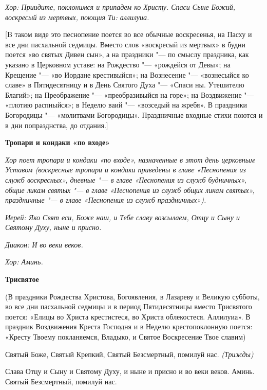 \itshape  Хор:\normalfont{} Приидите, поклонимся и припадем ко Христу. Спаси Сыне Божий, воскресый из мертвых, поющия Ти: аллилуиа.


[B таком виде это песнопение поется во все обычные воскресенья, на Пасху и все дни пасхальной седмицы. Вместо слов «воскресый из мертвых» в будни поется «во святых Дивен сын», а на праздники "--- по смыслу праздника, как указано в Церковном уставе: на Рождество "--- «рождейся от Девы»; на Крещение "--- «во Иордане крестивыйся»; на Вознесение "--- «вознесыйся ко славе» в Пятидесятницу и в День Святого Духа "--- «Спаси ны. Утешителю Благий»; на Преображение "--- «преобразивыйся на горе»; на Воздвижение "--- «плотию распныйся»; в Неделю ваий "--- «возседый на жребя». В праздники Богородицы "--- «молитвами Богородицы». Праздничные входные стихи поются и в дни попразднства, до отдания.]


\medskip
\bfseries Тропари и кондаки «по входе» \normalfont{}


\itshape Хор поет тропари и кондаки «по входе», назначенные в этот день церковным Уставом (воскресные тропари и кондаки приведены в главе «Песнопения из служб воскресных», дневные "--- в главе «Песнопения из служб будничных», общие ликам святых "--- в главе «Песнопения из служб общих ликам святых», праздничные "--- в главе «Песнопения из служб праздничных»).\normalfont{}


\itshape Иерей:\normalfont{} Яко Свят еси, Боже наш, и Тебе славу возсылаем, Отцу и Сыну и Святому Духу, ныне и присно.


\itshape Диакон:\normalfont{} И во веки веков.


\itshape Хор:\normalfont{} Аминь.




\medskip


\bfseries Трисвятое \normalfont{}


(В праздники Рождества Христова, Богоявления, в Лазареву и Великую субботы, во все дни пасхальной седмицы и в период Пятидесятницы вместо Трисвятого поется: «Елицы во Христа крестистеся, во Христа облекостеся. Аллилуиа». В праздник Воздвижения Креста Господня и в Неделю крестопоклонную поется: «Кресту Твоему покланяемся, Владыко, и Святое Воскресение Твое славим)


Святый Боже, Святый Крепкий, Святый Безсмертный, помилуй нас. \itshape (Трижды)\normalfont{}


Слава Отцу и Сыну и Святому Духу, и ныне и присно и во веки веков. Аминь. Святый Безсмертный, помилуй нас.



